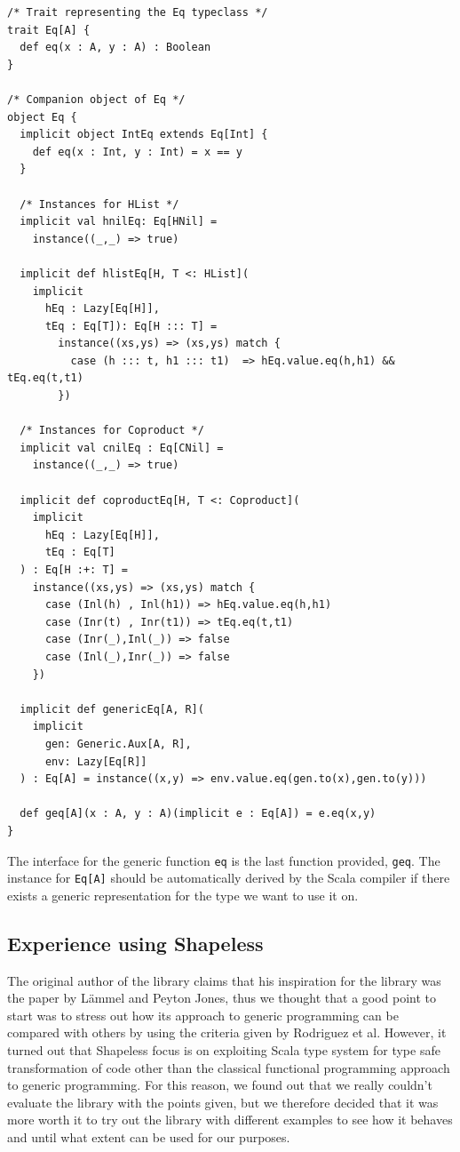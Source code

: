 \documentclass[a4paper]{article}
\newcommand{\scala}[1]{\lstinline[basicstyle=\ttfamily\color{white},style=scala]|#1|}
\begin{document}
\begin{lstlisting}[style=scala]
/* Trait representing the Eq typeclass */
trait Eq[A] {
  def eq(x : A, y : A) : Boolean
}

/* Companion object of Eq */
object Eq {
  implicit object IntEq extends Eq[Int] {
    def eq(x : Int, y : Int) = x == y
  }

  /* Instances for HList */
  implicit val hnilEq: Eq[HNil] =
    instance((_,_) => true)

  implicit def hlistEq[H, T <: HList](
    implicit
      hEq : Lazy[Eq[H]],
      tEq : Eq[T]): Eq[H ::: T] =
        instance((xs,ys) => (xs,ys) match {
          case (h ::: t, h1 ::: t1)  => hEq.value.eq(h,h1) && tEq.eq(t,t1)
        })

  /* Instances for Coproduct */
  implicit val cnilEq : Eq[CNil] =
    instance((_,_) => true)

  implicit def coproductEq[H, T <: Coproduct](
    implicit
      hEq : Lazy[Eq[H]],
      tEq : Eq[T]
  ) : Eq[H :+: T] =
    instance((xs,ys) => (xs,ys) match {
      case (Inl(h) , Inl(h1)) => hEq.value.eq(h,h1)
      case (Inr(t) , Inr(t1)) => tEq.eq(t,t1)
      case (Inr(_),Inl(_)) => false
      case (Inl(_),Inr(_)) => false
    })

  implicit def genericEq[A, R](
    implicit
      gen: Generic.Aux[A, R],
      env: Lazy[Eq[R]]
  ) : Eq[A] = instance((x,y) => env.value.eq(gen.to(x),gen.to(y)))

  def geq[A](x : A, y : A)(implicit e : Eq[A]) = e.eq(x,y)
}
\end{lstlisting}

The interface for the generic function \scala{eq} is the last function provided, \scala{geq}. The instance for \scala{Eq[A]} should be automatically derived by the Scala compiler if there exists a generic representation for the type we want to use it on.

\subsection{Experience using Shapeless}

The original author of the library claims that his inspiration for the library was the paper by L{\"a}mmel and Peyton Jones\cite{lammel2005scrap}, thus we thought that a good point to start was to stress out how its approach to generic programming can be compared with others by using the criteria given by Rodriguez et al\cite{rodriguez2008comparing}. However, it turned out that Shapeless focus is on exploiting Scala type system for type safe transformation of code other than the classical functional programming approach to generic programming. For this reason, we found out that we really couldn't evaluate the library with the points given, but we therefore decided that it was more worth it to try out the library with different examples to see how it behaves and until what extent can be used for our purposes.
\end{document}
